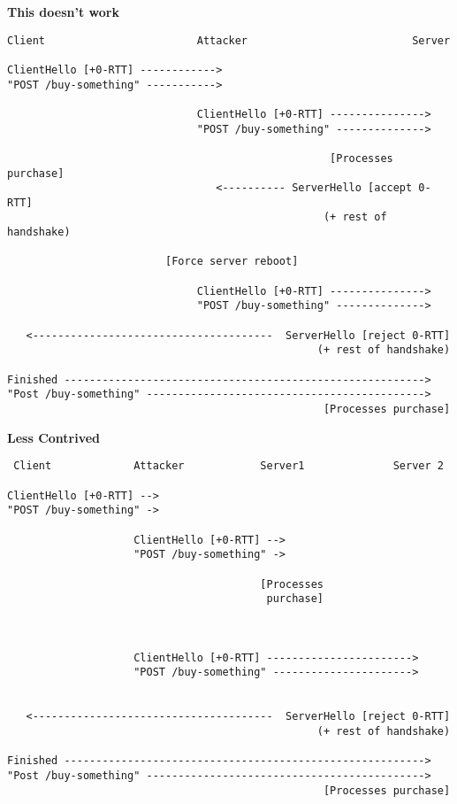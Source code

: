 \documentclass[helvetica]{seminar}
\newcommand{\heading}[1]{%
  \begin{center} 
    \large\bf 
    #1 
  \end{center} 
  \vspace{.4 in}}
\begin{document}
\begin{slide}
\heading{This doesn't work}

\vspace{-.45in}
{\scriptsize
\begin{verbatim}
Client                        Attacker                          Server

ClientHello [+0-RTT] ------------>
"POST /buy-something" ----------->      

                              ClientHello [+0-RTT] --------------->
                              "POST /buy-something" -------------->      
                           
                                                   [Processes purchase]
                                 <---------- ServerHello [accept 0-RTT]
                                                  (+ rest of handshake)

                         [Force server reboot]

                              ClientHello [+0-RTT] --------------->
                              "POST /buy-something" -------------->      

   <--------------------------------------  ServerHello [reject 0-RTT]
                                                 (+ rest of handshake)

Finished --------------------------------------------------------->
"Post /buy-something" -------------------------------------------->
                                                  [Processes purchase]
\end{verbatim}
}
\end{slide}


\begin{slide}
\heading{Less Contrived}

\vspace{-.45in}
{\scriptsize
\begin{verbatim}
 Client             Attacker            Server1              Server 2

ClientHello [+0-RTT] -->
"POST /buy-something" ->               

                    ClientHello [+0-RTT] -->
                    "POST /buy-something" ->
                                       
                                        [Processes
                                         purchase]               



                    ClientHello [+0-RTT] ----------------------->
                    "POST /buy-something" ---------------------->


   <--------------------------------------  ServerHello [reject 0-RTT]
                                                 (+ rest of handshake)

Finished --------------------------------------------------------->
"Post /buy-something" -------------------------------------------->
                                                  [Processes purchase]
\end{verbatim}
}
\end{slide}
\end{document}
